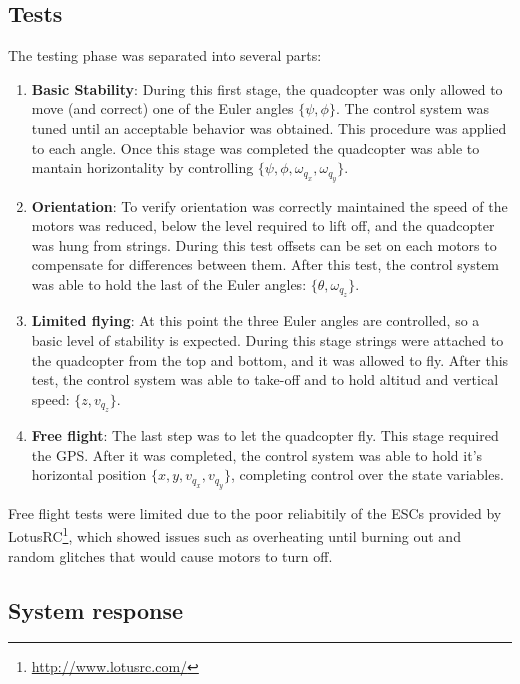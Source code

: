 \documentclass[conference]{IEEEtran}
\begin{document}
\subsection{Tests}
\label{sec:results-tests}

The testing phase was separated into several parts:

\begin{enumerate}
\item \textbf{Basic Stability}: During this first stage, the quadcopter was only allowed to move (and correct) one of the Euler angles $\{\psi,\phi\}$. The control system was tuned until an acceptable behavior was obtained. This procedure was applied to each angle. Once this stage was completed the quadcopter was able to mantain horizontality by controlling $\{\psi,\phi,\omega_{q_x},\omega_{q_y}\}$.
\item \textbf{Orientation}: To verify orientation was correctly maintained the speed of the motors was reduced, below the level required to lift off, and the quadcopter was hung from strings. During this test offsets can be set on each motors to compensate for differences between them. After this test, the control system was able to hold the last of the Euler angles: $\{\theta,\omega_{q_z}\}$.
\item \textbf{Limited flying}: At this point the three Euler angles are controlled, so a basic level of stability is expected. During this stage strings were attached to the quadcopter from the top and bottom, and it was allowed to fly. After this test, the control system was able to take-off and to hold altitud and vertical speed: $\{z,v_{q_z}\}$.
\item \textbf{Free flight}: The last step was to let the quadcopter fly. This stage required the GPS. After it was completed, the control system was able to hold it's horizontal position $\{x,y,v_{q_x},v_{q_y}\}$, completing control over the state variables.
\end{enumerate}

Free flight tests were limited due to the poor reliabitily of the ESCs provided by LotusRC\footnote{\url{http://www.lotusrc.com/}}, which showed issues such as overheating until burning out and random glitches that would cause motors to turn off.

\subsection{System response}
\label{sec:results-system-response}
\end{document}
